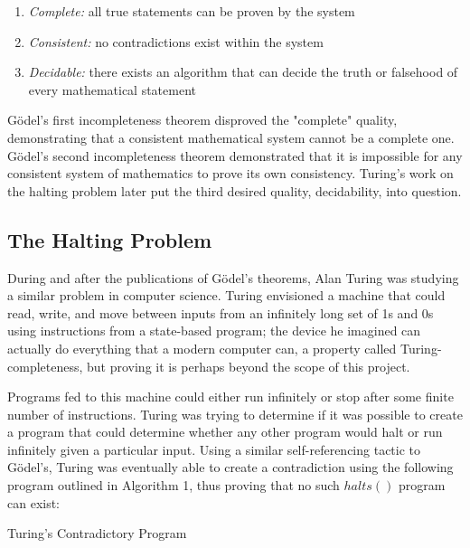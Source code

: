 \documentclass[conference]{IEEEtran}
\begin{document}
\begin{enumerate}[noitemsep]
    \item \emph{Complete:} all true statements can be proven by the system
    \item \emph{Consistent:} no contradictions exist within the system
    \item \emph{Decidable:} there exists an algorithm that can decide the truth or falsehood of every mathematical statement
\end{enumerate}

Gödel's first incompleteness theorem disproved the "complete" quality, demonstrating that a consistent mathematical system cannot be a complete one. Gödel's second incompleteness theorem demonstrated that it is impossible for any consistent system of mathematics to prove its own consistency. Turing's work on the halting problem later put the third desired quality, decidability, into question.\bigskip

\subsection{The Halting Problem}
During and after the publications of Gödel's theorems, Alan Turing was studying a similar problem in computer science. Turing envisioned a machine that could read, write, and move between inputs from an infinitely long set of 1s and 0s using instructions from a state-based program; the device he imagined can actually do everything that a modern computer can, a property called Turing-completeness, but proving it is perhaps beyond the scope of this project.

Programs fed to this machine could either run infinitely or stop after some finite number of instructions. Turing was trying to determine if it was possible to create a program that could determine whether any other program would halt or run infinitely given a particular input. Using a similar self-referencing tactic to Gödel's, Turing was eventually able to create a contradiction using the following program outlined in Algorithm 1, thus proving that no such $halts()$ program can exist: 

\begin{algorithm}[H]
\begin{algorithmic}
\caption{Turing's Contradictory Program}\label{alg:cap}
\Else
\EndIf
\end{algorithmic}
\end{algorithm}
\end{document}
